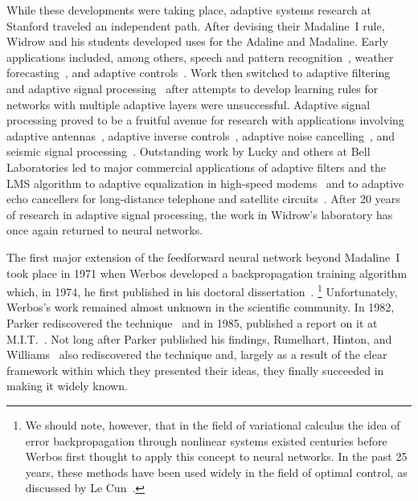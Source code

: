 \documentclass[10pt,twocolumn]{article}
\begin{document}
While these developments were taking place, adaptive systems research at
Stanford traveled an independent path. After devising their Madaline~I rule,
Widrow and his students developed uses for the Adaline and Madaline. Early
applications included, among others, speech and pattern recognition~\cite{talbert},
weather forecasting~\cite{hu}, and adaptive controls~\cite{broom}. Work then
switched to adaptive filtering and adaptive signal processing~\cite{asp} after
attempts to develop learning rules for networks with multiple adaptive layers
were unsuccessful. Adaptive signal processing proved to be a fruitful avenue
for research with applications involving adaptive antennas~\cite{antenna},
adaptive inverse controls~\cite{invctrl}, adaptive noise cancelling~\cite{anc},
and seismic signal processing~\cite{asp}. Outstanding work by Lucky and others
at Bell Laboratories led to major commercial applications of adaptive filters
and the LMS algorithm to adaptive equalization in high-speed
modems~\cite{lucky1,lucky2} and to adaptive echo cancellers for long-distance
telephone and satellite circuits~\cite{sondhi}. After 20 years of research in
adaptive signal processing, the work in Widrow's laboratory has once again
returned to neural networks.

The first major extension of the feedforward neural network beyond Madaline~I
took place in 1971 when Werbos developed a backpropagation training algorithm
which, in 1974, he first published in his doctoral dissertation~\cite{werbos}.%
\footnote{We should note, however, that in the field of variational calculus the
idea of error backpropagation through nonlinear systems existed centuries
before Werbos first thought to apply this concept to neural networks. In the
past 25 years, these methods have been used widely in the field of optimal
control, as discussed by Le Cun~\cite{lecun}.}
Unfortunately, Werbos's work remained almost unknown in the scientific
community. In 1982, Parker rediscovered the technique~\cite{parker82} and in
1985, published a report on it at M.I.T.~\cite{parker85}. Not long after Parker
published his findings, Rumelhart, Hinton, and Williams~\cite{rhw85,rhw86} also
rediscovered the technique and, largely as a result of the clear framework
within which they presented their ideas, they finally succeeded in making it
widely known.
\end{document}
